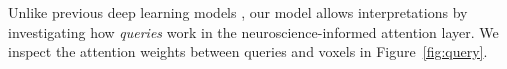
Unlike previous deep learning models \cite{scotti2024mindeye2,mai2023unibrain}, our model allows interpretations by investigating how \textit{queries} work in the neuroscience-informed attention layer. We inspect the attention weights between queries and voxels in Figure~\ref{fig:query}. 

